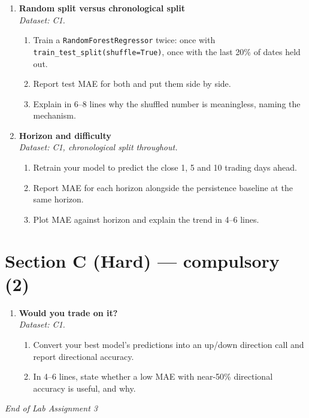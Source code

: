 \documentclass[11pt,a4paper]{article}
\begin{document}
\begin{enumerate}[label=\textbf{B\arabic*.}, leftmargin=*]

  \item \textbf{Random split versus chronological split} \\
    \emph{Dataset: C1.}
    \begin{enumerate}[label=(\alph*), leftmargin=*]
      \item Train a \texttt{RandomForestRegressor} twice: once with \texttt{train\_test\_split(shuffle=True)}, once with the last 20\% of dates held out.
      \item Report test MAE for both and put them side by side.
      \item Explain in 6--8 lines why the shuffled number is meaningless, naming the mechanism.
    \end{enumerate}

  \item \textbf{Horizon and difficulty} \\
    \emph{Dataset: C1, chronological split throughout.}
    \begin{enumerate}[label=(\alph*), leftmargin=*]
      \item Retrain your model to predict the close 1, 5 and 10 trading days ahead.
      \item Report MAE for each horizon alongside the persistence baseline at the same horizon.
      \item Plot MAE against horizon and explain the trend in 4--6 lines.
    \end{enumerate}

\end{enumerate}

\section*{Section C (Hard) --- compulsory \quad (2)}

\begin{enumerate}[label=\textbf{C\arabic*.}, leftmargin=*]

  \item \textbf{Would you trade on it?} \\
    \emph{Dataset: C1.}
    \begin{enumerate}[label=(\alph*), leftmargin=*]
      \item Convert your best model's predictions into an up/down direction call and report directional accuracy.
      \item In 4--6 lines, state whether a low MAE with near-50\% directional accuracy is useful, and why.
    \end{enumerate}

\end{enumerate}

\vfill\noindent\textit{End of Lab Assignment 3}

\notesources{\AMLLabSources}
\end{document}
